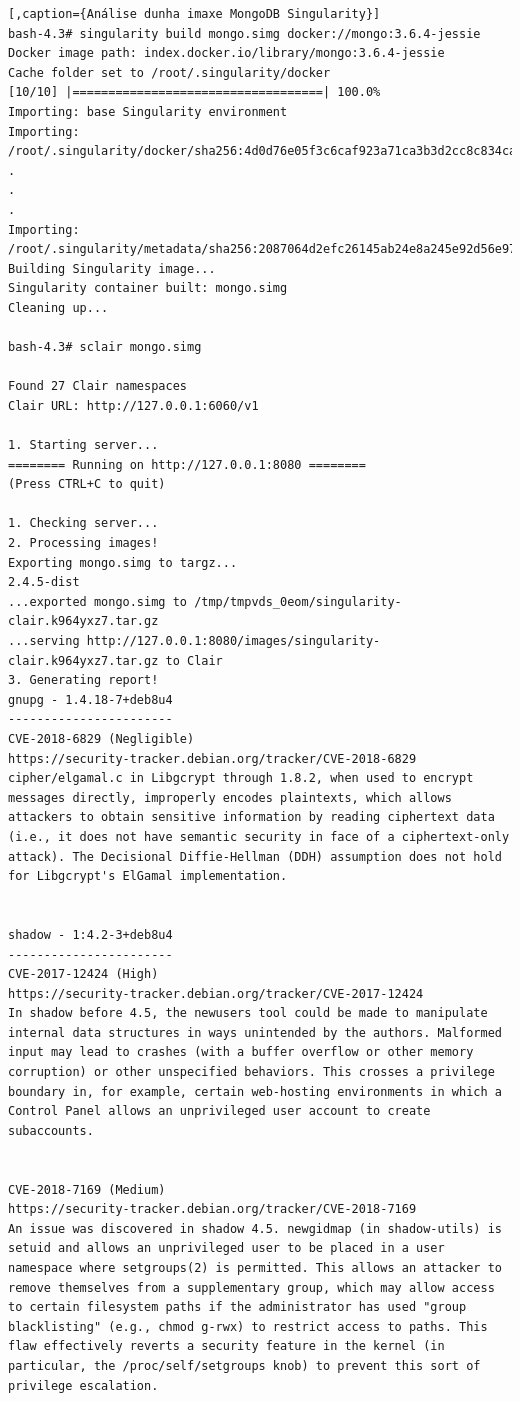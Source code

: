 \begin{lstlisting}[,caption={Análise dunha imaxe MongoDB Singularity}]
bash-4.3# singularity build mongo.simg docker://mongo:3.6.4-jessie
Docker image path: index.docker.io/library/mongo:3.6.4-jessie
Cache folder set to /root/.singularity/docker
[10/10] |===================================| 100.0% 
Importing: base Singularity environment
Importing: /root/.singularity/docker/sha256:4d0d76e05f3c6caf923a71ca3b3d2cc8c834ca61779ae6b6d83547f3dd814980.tar.gz
.
.
.
Importing: /root/.singularity/metadata/sha256:2087064d2efc26145ab24e8a245e92d56e97c9e6df934621d02524aab46bea19.tar.gz
Building Singularity image...
Singularity container built: mongo.simg
Cleaning up...

bash-4.3# sclair mongo.simg 

Found 27 Clair namespaces
Clair URL: http://127.0.0.1:6060/v1

1. Starting server...
======== Running on http://127.0.0.1:8080 ========
(Press CTRL+C to quit)

1. Checking server...
2. Processing images!
Exporting mongo.simg to targz...
2.4.5-dist
...exported mongo.simg to /tmp/tmpvds_0eom/singularity-clair.k964yxz7.tar.gz
...serving http://127.0.0.1:8080/images/singularity-clair.k964yxz7.tar.gz to Clair
3. Generating report!
gnupg - 1.4.18-7+deb8u4
-----------------------
CVE-2018-6829 (Negligible)
https://security-tracker.debian.org/tracker/CVE-2018-6829
cipher/elgamal.c in Libgcrypt through 1.8.2, when used to encrypt messages directly, improperly encodes plaintexts, which allows attackers to obtain sensitive information by reading ciphertext data (i.e., it does not have semantic security in face of a ciphertext-only attack). The Decisional Diffie-Hellman (DDH) assumption does not hold for Libgcrypt's ElGamal implementation.


shadow - 1:4.2-3+deb8u4
-----------------------
CVE-2017-12424 (High)
https://security-tracker.debian.org/tracker/CVE-2017-12424
In shadow before 4.5, the newusers tool could be made to manipulate internal data structures in ways unintended by the authors. Malformed input may lead to crashes (with a buffer overflow or other memory corruption) or other unspecified behaviors. This crosses a privilege boundary in, for example, certain web-hosting environments in which a Control Panel allows an unprivileged user account to create subaccounts.


CVE-2018-7169 (Medium)
https://security-tracker.debian.org/tracker/CVE-2018-7169
An issue was discovered in shadow 4.5. newgidmap (in shadow-utils) is setuid and allows an unprivileged user to be placed in a user namespace where setgroups(2) is permitted. This allows an attacker to remove themselves from a supplementary group, which may allow access to certain filesystem paths if the administrator has used "group blacklisting" (e.g., chmod g-rwx) to restrict access to paths. This flaw effectively reverts a security feature in the kernel (in particular, the /proc/self/setgroups knob) to prevent this sort of privilege escalation.



\end{lstlisting}
